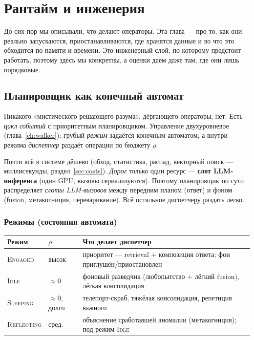\chapter{Рантайм и инженерия}
\label{ch:runtime}

До сих пор мы описывали, что делают операторы. Эта глава — про то, как они реально
запускаются, приостанавливаются, где хранятся данные и во что это обходится по памяти
и времени. Это инженерный слой, по которому предстоит работать, поэтому здесь мы
конкретны, а оценки даём даже там, где они лишь порядковые.

\section{Планировщик как конечный автомат}
\label{sec:scheduler}

Никакого «мистического решающего разума», дёргающего операторы, нет. Есть
\emph{цикл событий} с приоритетным планировщиком. Управление двухуровневое
(глава~\ref{ch:walker}): грубый \emph{режим} задаётся конечным автоматом, а внутри
режима \emph{диспетчер} раздаёт операции по бюджету $\rho$.

\begin{definition}
Почти всё в системе дёшево (обход, статистика, распад, векторный поиск — миллисекунды,
раздел~\ref{sec:costs}). \emph{Дорог} только один ресурс — \textbf{слот
LLM-инференса} (один GPU, вызовы сериализуются). Поэтому планировщик по сути
распределяет \emph{слоты LLM-вызовов} между передним планом (ответ) и фоном
(fusion, метакогниция, переваривание). Всё остальное диспетчеру раздать легко.
\end{definition}

\subsection{Режимы (состояния автомата)}

\begin{center}
\begin{tabular}{p{} p{} p{}}
\toprule
\textbf{Режим} & $\rho$ & \textbf{Что делает диспетчер} \\
\midrule
\textsc{Engaged} & высок & приоритет — retrieval $+$ композиция ответа; фон приглушён/приостановлен \\
\textsc{Idle} & $\approx 0$ & фоновый разведчик (любопытство $+$ лёгкий fusion), лёгкая консолидация \\
\textsc{Sleeping} & $\approx 0$, долго & телепорт-скраб, тяжёлая консолидация, репетиция важного \\
\textsc{Reflecting} & сред. & объяснение сработавшей аномалии (метакогниция); под-режим \textsc{Idle} \\
\bottomrule
\end{tabular}
\end{center}

